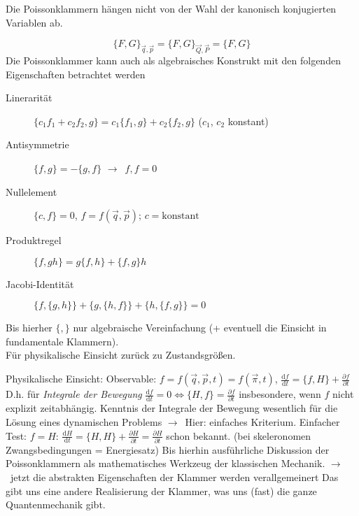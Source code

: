 \documentclass[oneside]{book}
\theoremstyle{definition}
\newcommand{\conseq}{$\rightarrow$~}
\renewcommand{\d}{\mathrm d}
\newcommand{\ddd}[2]{\frac{\d #1}{\d #2}}
\newcommand{\ffpartial}[2]{\frac{\partial #1}{\partial #2}}
\newcommand{\const}{\text{konstant}}
\begin{document}
Die Poissonklammern hängen nicht von der Wahl der kanonisch konjugierten Variablen ab.

$$\{F, G\}_{\vec{q}, \vec{p}} = \{F, G\}_{\vec{Q}, \vec{P}} = \{F, G\}$$
Die Poissonklammer kann auch als algebraisches Konstrukt mit den folgenden Eigenschaften betrachtet werden 
\begin{description}
	\item[Linerarität] $\{c_1 f_1 + c_2 f_2, g\} = c_1 \{f_1, g\} + c_2 \{f_2, g\}$ ($c_1$, $c_2$ konstant)
	\item[Antisymmetrie] $\{f, g\} = - \{g, f\}$ \conseq ${f, f} = 0$
	\item[Nullelement] $\{c, f\} = 0$, $f=f(\vec{q}, \vec{p})$; $c = \const$
	\item[Produktregel] $\{f, g h\} = g \{f, h\} + \{f, g\} h$
	\item[Jacobi-Identität] $\{f, \{g, h\}\} + \{g, \{h, f\}\} + \{h, \{f, g\}\} = 0$
\end{description}

Bis hierher $\{,\}$ nur algebraische Vereinfachung (+ eventuell die Einsicht in fundamentale Klammern).\\
Für physikalische Einsicht zurück zu Zustandsgrößen.

Physikalische Einsicht:
Observable: $f = f(\vec{q}, \vec{p}, t) = f(\vec{\pi}, t)$, $\ddd{f}{t} = \{f, H\} + \ffpartial{f}{t}$
D.h. für \textit{Integrale der Bewegung}
$\ddd{f}{t} = 0 \Leftrightarrow \{H, f\} = \ffpartial{f}{t}$
insbesondere, wenn $f$ nicht explizit zeitabhängig. Kenntnis der Integrale der Bewegung wesentlich für die Lösung eines dynamischen Problems \conseq Hier: einfaches Kriterium.
Einfacher Test: $f = H$: $\ddd{H}{t} = \{H, H\} + \ffpartial{H}{t} = \ffpartial{H}{t}$ schon bekannt. (bei skeleronomen Zwangsbedingungen = Energiesatz) 
Bis hierhin ausführliche Diskussion der Poissonklammern als mathematisches Werkzeug der klassischen Mechanik.
\conseq jetzt die abstrakten Eigenschaften der Klammer werden verallgemeinert
Das gibt uns eine andere Realisierung der Klammer, was uns (fast) die ganze Quantenmechanik gibt.
\end{document}
